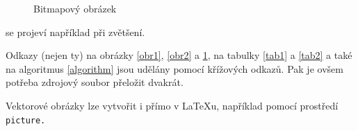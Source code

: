 \documentclass[a4paper,11pt]{article}
\begin{document}
\begin{figure}[h]
\centering
{}
\caption{Bitmapový obrázek}
\label{obr3}
\end{figure}
\bigskip

\noindent
se projeví například při zvětšení.

Odkazy (nejen ty) na obrázky \ref{obr1}, \ref{obr2} a \ref{obr3}, na tabulky \ref{tab1} a \ref{tab2} a také na algoritmus \ref{algorithm} jsou udělány pomocí křížových odkazů. Pak je ovšem potřeba zdrojový soubor přeložit dvakrát.
\par
Vektorové obrázky lze vytvořit i přímo v {\LaTeX}u, například pomocí prostředí\texttt{ picture.}




\newpage
\end{document}
